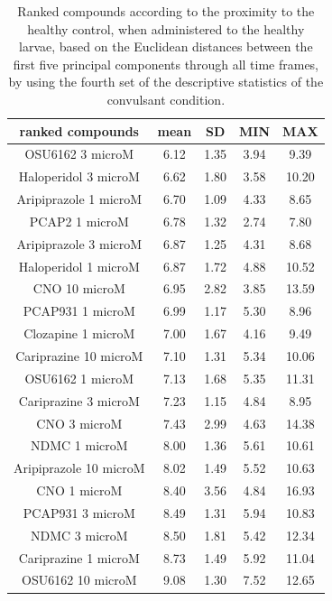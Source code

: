 \documentclass[a4paper,12pt]{article}
\begin{document}
\newpage
\begin{table}[h!]\tiny
\centering
\caption{Ranked compounds according to the proximity to the healthy control, when administered to the healthy larvae, based on the Euclidean distances between the first five principal components through all time frames, by using the fourth set of the descriptive statistics of the convulsant condition.}
\begin{tabular}{|c|c|c|c|c|}
\hline
ranked compounds             & mean & SD   & MIN  & MAX   \\ \hline
OSU6162 3 microM       & 6.12  & 1.35 & 3.94 & 9.39  \\ \hline
Haloperidol 3 microM   & 6.62  & 1.80  & 3.58 & 10.20  \\ \hline
Aripiprazole 1 microM  & 6.70   & 1.09 & 4.33 & 8.65  \\ \hline
PCAP2 1 microM         & 6.78  & 1.32 & 2.74 & 7.80   \\ \hline
Aripiprazole 3 microM  & 6.87  & 1.25 & 4.31 & 8.68  \\ \hline
Haloperidol 1 microM   & 6.87  & 1.72 & 4.88 & 10.52 \\ \hline
CNO 10 microM          & 6.95  & 2.82 & 3.85 & 13.59 \\ \hline
PCAP931 1 microM       & 6.99  & 1.17 & 5.30  & 8.96  \\ \hline
Clozapine 1 microM     & 7.00     & 1.67 & 4.16 & 9.49  \\ \hline
Cariprazine 10 microM  & 7.10   & 1.31 & 5.34 & 10.06 \\ \hline
OSU6162 1 microM       & 7.13  & 1.68 & 5.35 & 11.31 \\ \hline
Cariprazine 3 microM   & 7.23  & 1.15 & 4.84 & 8.95  \\ \hline
CNO 3 microM           & 7.43  & 2.99 & 4.63 & 14.38 \\ \hline
NDMC 1 microM          & 8.00     & 1.36 & 5.61 & 10.61 \\ \hline
Aripiprazole 10 microM & 8.02  & 1.49 & 5.52 & 10.63 \\ \hline
CNO 1 microM           & 8.40   & 3.56 & 4.84 & 16.93 \\ \hline
PCAP931 3 microM       & 8.49  & 1.31 & 5.94 & 10.83 \\ \hline
NDMC 3 microM          & 8.50   & 1.81 & 5.42 & 12.34 \\ \hline
Cariprazine 1 microM   & 8.73  & 1.49 & 5.92 & 11.04 \\ \hline
OSU6162 10 microM      & 9.08  & 1.30  & 7.52 & 12.65 \\ \hline

\end{tabular}
\end{table}
\end{document}
